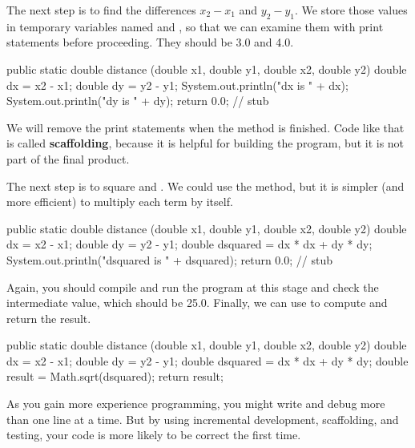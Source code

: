 The next step is to find the differences $x_2 - x_1$ and $y_2 - y_1$.
We store those values in temporary variables named  and , so that we can examine them with print statements before proceeding.
They should be 3.0 and 4.0.

\begin{code}
public static double distance
        (double x1, double y1, double x2, double y2) {
    double dx = x2 - x1;
    double dy = y2 - y1;
    System.out.println("dx is " + dx);
    System.out.println("dy is " + dy);
    return 0.0;  // stub
}
\end{code}


We will remove the print statements when the method is finished.
Code like that is called {\bf scaffolding}, because it is helpful for building the program, but it is not part of the final product.

The next step is to square  and .
We could use the  method, but it is simpler (and more efficient) to multiply each term by itself.

\begin{code}
public static double distance
        (double x1, double y1, double x2, double y2) {
    double dx = x2 - x1;
    double dy = y2 - y1;
    double dsquared = dx * dx + dy * dy;
    System.out.println("dsquared is " + dsquared);
    return 0.0;  // stub
}
\end{code}

Again, you should compile and run the program at this stage and check the intermediate value, which should be 25.0.
Finally, we can use  to compute and return the result.

\begin{code}
public static double distance
        (double x1, double y1, double x2, double y2) {
    double dx = x2 - x1;
    double dy = y2 - y1;
    double dsquared = dx * dx + dy * dy;
    double result = Math.sqrt(dsquared);
    return result;
}
\end{code}


As you gain more experience programming, you might write and debug more than one line at a time.
But by using incremental development, scaffolding, and testing, your code is more likely to be correct the first time.


